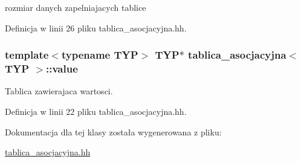 rozmiar danych zapelniajacych tablice 



\-Definicja w linii 26 pliku tablica\-\_\-asocjacyjna.\-hh.

\hypertarget{classtablica__asocjacyjna_a28719743b86b0a16db652afda20b665c}{
\subsubsection[{value}]{\setlength{\rightskip}{0pt plus 5cm}template$<$typename \-T\-Y\-P$>$ \-T\-Y\-P$\ast$ {\bf tablica\-\_\-asocjacyjna}$<$ \-T\-Y\-P $>$\-::{\bf value}}}\label{classtablica__asocjacyjna_a28719743b86b0a16db652afda20b665c}


\-Tablica zawierajaca wartosci. 



\-Definicja w linii 22 pliku tablica\-\_\-asocjacyjna.\-hh.



\-Dokumentacja dla tej klasy została wygenerowana z pliku\-:\begin{DoxyCompactItemize}
\item 
\hyperlink{tablica__asocjacyjna_8hh}{tablica\-\_\-asocjacyjna.\-hh}\end{DoxyCompactItemize}
